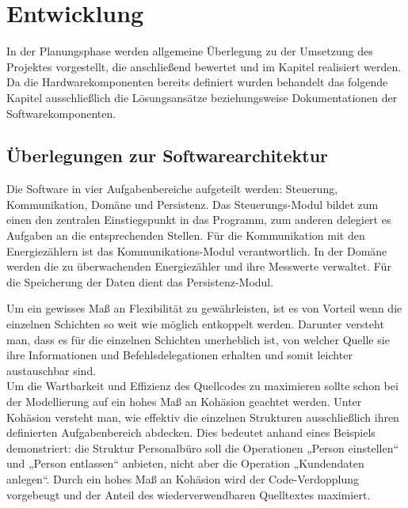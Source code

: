 \documentclass[Bachelorarbeit.tex]{subfiles}
\begin{document}
\chapter{Entwicklung}
In der Planungsphase werden allgemeine Überlegung zu der Umsetzung 
des Projektes vorgestellt, die anschließend bewertet und im Kapitel 
 realisiert werden. Da die Hardwarekomponenten bereits definiert wurden 
behandelt das folgende Kapitel ausschließlich die Lösungsansätze 
beziehungsweise Dokumentationen der Softwarekomponenten.

\section{Überlegungen zur Softwarearchitektur}
\begin{comment}
Zum aktuellen Stand kann die Software in vier Aufgabenbereiche aufgeteilt werden:
\end{comment}
Die Software in vier Aufgabenbereiche aufgeteilt werden: 
Steuerung, Kommunikation, Domäne und Persistenz. 
Das Steuerungs-Modul bildet zum einen den zentralen Einstiegspunkt in das Programm, zum anderen delegiert es Aufgaben an die entsprechenden Stellen. 
Für die Kommunikation mit den Energiezählern ist das Kommunikations-Modul verantwortlich. 
In der Domäne werden die zu überwachenden Energiezähler und ihre Messwerte verwaltet. 
Für die Speicherung der Daten dient das Persistenz-Modul.\\
%
\begin{comment}
Um ein gewissen Maß an Flexibilität zur gewährleisten sowie um Änderungen beziehungsweise spätere Erweiterungen zu ermöglichen, ist es von Vorteil wenn die einzelnen Schichten so weit wie möglich entkoppelt werden. 
\end{comment}
Um ein gewisses Maß an Flexibilität zu gewährleisten, ist es von Vorteil wenn die einzelnen Schichten so weit wie möglich entkoppelt werden. 
Darunter versteht man, dass es für die einzelnen Schichten unerheblich ist, von welcher Quelle sie ihre Informationen und Befehlsdelegationen erhalten und somit leichter austauschbar sind. \\
%
Um die Wartbarkeit und Effizienz des Quellcodes zu maximieren 
sollte schon bei der Modellierung auf ein hohes Maß an Kohäsion geachtet 
werden. Unter Kohäsion versteht man, wie effektiv die einzelnen 
Strukturen ausschließlich ihren definierten Aufgabenbereich abdecken. Dies 
bedeutet anhand eines Beispiels demonstriert: die Struktur 
Personalbüro soll die Operationen „Person einstellen“ und „Person entlassen“ 
anbieten, nicht aber die Operation „Kundendaten anlegen“. 
Durch ein hohes Maß an Kohäsion wird der Code-Verdopplung vorgebeugt und 
der Anteil des wiederverwendbaren Quelltextes maximiert. \\
\end{document}
